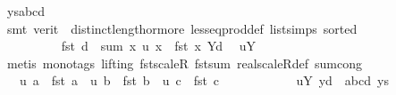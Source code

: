 \begin{isabellebody}
\ ys{\isacharunderscore}{\kern0pt}abcd\ {\isachardoublequoteopen}{}{\isachardoublequoteclose}\isanewline
\ \ \ \ \ \ \ \ \ \ \isamarkupfalse%
\ {\isacharparenleft}{\kern0pt}smt\ {\isacharparenleft}{\kern0pt}verit{\isacharparenright}{\kern0pt}\ \ distinct{\isacharunderscore}{\kern0pt}length{\isacharunderscore}{\kern0pt}{}{\isacharunderscore}{\kern0pt}or{\isacharunderscore}{\kern0pt}more\ less{\isacharunderscore}{\kern0pt}eq{\isacharunderscore}{\kern0pt}prod{\isacharunderscore}{\kern0pt}def\ list{\isachardot}{\kern0pt}simps{\isacharparenleft}{\kern0pt}{}{\isacharparenright}{\kern0pt}\ sorted{}{\isacharparenright}{\kern0pt}{\isacharplus}{\kern0pt}\isanewline
\ \ \ \ \ \ \isanewline
\ \ \ \ \ \ \ \ \isamarkupfalse%
\ {\isachardoublequoteopen}fst\ d\ {\isacharequal}{\kern0pt}\ sum\ {\isacharparenleft}{\kern0pt}{\isasymlambda}x{\isachardot}{\kern0pt}\ u\ x\ {\isacharasterisk}{\kern0pt}\ {\isacharparenleft}{\kern0pt}fst\ x{\isacharparenright}{\kern0pt}{\isacharparenright}{\kern0pt}\ {\isacharparenleft}{\kern0pt}Y{\isacharminus}{\kern0pt}{\isacharbraceleft}{\kern0pt}d{\isacharbraceright}{\kern0pt}{\isacharparenright}{\kern0pt}{\isachardoublequoteclose}\ \isamarkupfalse%
\ uY\isanewline
\ \ \ \ \ \ \ \ \ \ \isamarkupfalse%
\ {\isacharparenleft}{\kern0pt}metis\ {\isacharparenleft}{\kern0pt}mono{\isacharunderscore}{\kern0pt}tags{\isacharcomma}{\kern0pt}\ lifting{\isacharparenright}{\kern0pt}\ fst{\isacharunderscore}{\kern0pt}scaleR\ fst{\isacharunderscore}{\kern0pt}sum\ real{\isacharunderscore}{\kern0pt}scaleR{\isacharunderscore}{\kern0pt}def\ sum{\isachardot}{\kern0pt}cong{\isacharparenright}{\kern0pt}\isanewline
\isanewline
\ \ \ \ \ \ \ \ \isamarkupfalse%
\ \isamarkupfalse%
\ {\isachardoublequoteopen}{\isachardot}{\kern0pt}{\isachardot}{\kern0pt}{\isachardot}{\kern0pt}\ {\isacharequal}{\kern0pt}\ u\ a\ {\isacharasterisk}{\kern0pt}\ {\isacharparenleft}{\kern0pt}fst\ a{\isacharparenright}{\kern0pt}\ {\isacharplus}{\kern0pt}\ u\ b\ {\isacharasterisk}{\kern0pt}\ {\isacharparenleft}{\kern0pt}fst\ b{\isacharparenright}{\kern0pt}\ {\isacharplus}{\kern0pt}\ u\ c\ {\isacharasterisk}{\kern0pt}\ {\isacharparenleft}{\kern0pt}fst\ c{\isacharparenright}{\kern0pt}{\isachardoublequoteclose}\isanewline
\ \ \ \ \ \ \ \ \ \ \isamarkupfalse%
\ uY{\isacharparenleft}{\kern0pt}{}{\isacharparenright}{\kern0pt}\ y{\isacharunderscore}{\kern0pt}d\ {\isachardoublequoteopen}{}{}{\isachardoublequoteclose}\ abcd\ ys\isanewline

\end{isabellebody}
